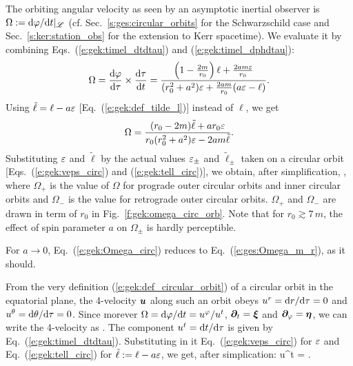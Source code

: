 The orbiting angular velocity as seen by an asymptotic inertial observer is
$\Omega := \mathrm{d}\varphi/\mathrm{d} t |_{\mathscr{L}}$ (cf. Sec.~\ref{s:ges:circular_orbits} for the
Schwarzschild case and Sec.~\ref{s:ker:station_obs} for the extension to Kerr
spacetime).
We evaluate it by combining Eqs.~(\ref{e:gek:timel_dtdtau}) and (\ref{e:gek:timel_dphdtau}):
\[
    \Omega = \frac{\mathrm{d}\varphi}{\mathrm{d}\tau} \times \frac{\mathrm{d}\tau}{\mathrm{d} t}
        = \frac{ \left( 1 - \frac{2m}{r_0} \right) \ell
    + \frac{2 am \varepsilon}{r_0} }{(r_0^2 + a^2) \varepsilon + \frac{2 a m}{r_0} (a\varepsilon - \ell)} .
\]
Using $\tilde{\ell} = \ell - a\varepsilon$ [Eq.~(\ref{e:gek:def_tilde_l})] instead of $\ell$, we
get
\[
    \Omega = \frac{(r_0 - 2m) \tilde{\ell} + a r_0 \varepsilon}{r_0(r_0^2 + a^2) \varepsilon
    - 2 a m \tilde{\ell}} .
\]
Substituting $\varepsilon$ and $\tilde{\ell}$ by the actual values $\varepsilon_\pm$
and $\tilde{\ell}_\pm$ taken on a circular orbit [Eqs.~(\ref{e:gek:veps_circ})
and (\ref{e:gek:tell_circ})], we obtain, after simplification,
\be \label{e:gek:Omega_circ}
     ,
\ee
where $\Omega_+$ is the value of $\Omega$ for prograde outer circular orbits
and inner circular orbits and $\Omega_-$ is the value for retrograde
outer circular orbits. $\Omega_+$ and $\Omega_-$ are drawn in term of $r_0$
in Fig.~\ref{f:gek:omega_circ_orb}. Note that for $r_0 \gtrsim 7\, m$,
the effect of spin parameter $a$ on $\Omega_\pm$ is hardly perceptible.

\begin{remark}
For $a\to 0$, Eq.~(\ref{e:gek:Omega_circ}) reduces to Eq.~(\ref{e:ges:Omega_m_r}), as it should.
\end{remark}

From the very definition (\ref{e:gek:def_circular_orbit}) of a circular orbit
in the equatorial plane, the 4-velocity $\bm{u}$ along such an orbit
obeys $u^r = \mathrm{d} r/\mathrm{d}\tau = 0$ and $u^\theta = \mathrm{d}\theta/\mathrm{d}\tau = 0$. Since morever
$\Omega = \mathrm{d}\varphi/\mathrm{d} t = u^\varphi / u^t$, $\bm{\partial}_t = \bm{\xi}$ and $\bm{\partial}_\varphi = \bm{\eta}$,
we can write the 4-velocity as
\be \label{e:gek:4vel_circ_orb}
     .
\ee
The component $u^t = \mathrm{d} t / \mathrm{d}\tau$ is given by Eq.~(\ref{e:gek:timel_dtdtau}).
Substituting in it Eq.~(\ref{e:gek:veps_circ}) for $\varepsilon$
and Eq.~(\ref{e:gek:tell_circ}) for $\tilde{\ell} := \ell - a \varepsilon$, we
get, after simplication:
\be \label{e:gek:ut_circ_orb}
    u^t =  .
\ee

